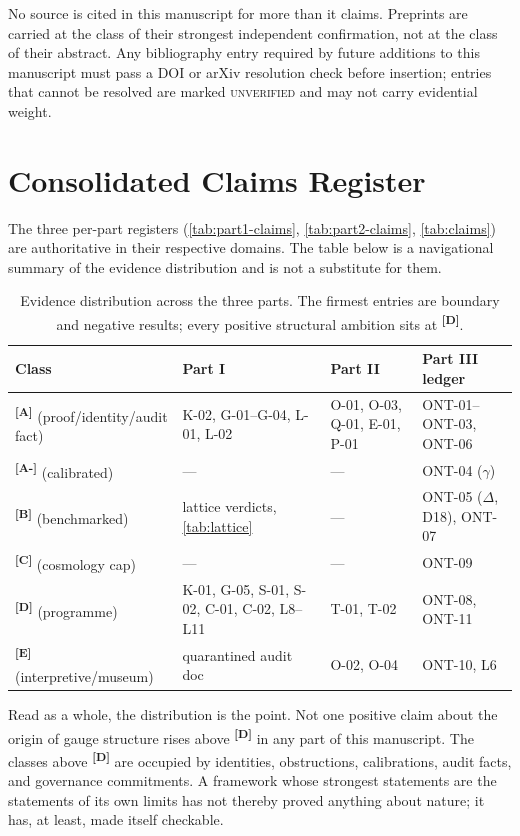 \documentclass[12pt,a4paper,twoside]{article}
\theoremstyle{plain}
\theoremstyle{definition}
\theoremstyle{remark}
\newcommand{\catmark}[1]{\textsuperscript{\textsf{\textbf{[#1]}}}}
\begin{document}
\noindent No source is cited in this manuscript for more than it claims.
Preprints are carried at the class of their strongest independent
confirmation, not at the class of their abstract. Any bibliography entry
required by future additions to this manuscript must pass a DOI or arXiv
resolution check before insertion; entries that cannot be resolved are
marked \textsc{unverified} and may not carry evidential weight.

\section{Consolidated Claims Register}
\label{sec:consolidated-claims}

\noindent The three per-part registers (\cref{tab:part1-claims},
\cref{tab:part2-claims}, \cref{tab:claims}) are authoritative in their
respective domains. The table below is a navigational summary of the
evidence distribution and is not a substitute for them.

\begin{table}[htbp]
\centering\scriptsize
\begin{tabular}{@{}p{2.5cm}p{3.4cm}p{3.2cm}p{3.4cm}@{}}
\toprule
Class & Part I & Part II & Part III ledger \\
\midrule
\catmark{A} (proof/identity/audit fact) & K-02, G-01--G-04, L-01, L-02 & O-01, O-03, Q-01, E-01, P-01 & ONT-01--ONT-03, ONT-06 \\
\catmark{A-} (calibrated) & --- & --- & ONT-04 ($\gamma$) \\
\catmark{B} (benchmarked) & lattice verdicts, \cref{tab:lattice} & --- & ONT-05 ($\Delta$, D18), ONT-07 \\
\catmark{C} (cosmology cap) & --- & --- & ONT-09 \\
\catmark{D} (programme) & K-01, G-05, S-01, S-02, C-01, C-02, L8--L11 & T-01, T-02 & ONT-08, ONT-11 \\
\catmark{E} (interpretive/museum) & quarantined audit doc & O-02, O-04 & ONT-10, L6 \\
\bottomrule
\end{tabular}
\caption{Evidence distribution across the three parts. The firmest
entries are boundary and negative results; every positive structural
ambition sits at \catmark{D}.}
\label{tab:consolidated}
\end{table}

\noindent Read as a whole, the distribution is the point. Not one
positive claim about the origin of gauge structure rises above
\catmark{D} in any part of this manuscript. The classes above \catmark{D} are
occupied by identities, obstructions, calibrations, audit facts, and
governance commitments. A framework whose strongest statements are the
statements of its own limits has not thereby proved anything about
nature; it has, at least, made itself checkable.
\end{document}
